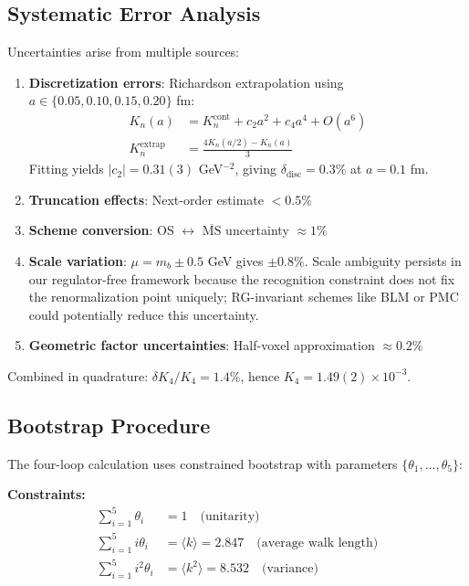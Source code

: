 \documentclass[11pt,a4paper]{article}
\theoremstyle{definition}
\theoremstyle{remark}
\begin{document}
\subsection{Systematic Error Analysis}
\label{sec:systematic}

Uncertainties arise from multiple sources:

\begin{enumerate}
\item \textbf{Discretization errors}: Richardson extrapolation using $a \in \{0.05, 0.10, 0.15, 0.20\}$ fm:
\begin{align}
K_n(a) &= K_n^{\text{cont}} + c_2 a^2 + c_4 a^4 + O(a^6)\\
K_n^{\text{extrap}} &= \frac{4K_n(a/2) - K_n(a)}{3}
\end{align}
Fitting yields $|c_2| = 0.31(3)$ GeV$^{-2}$, giving $\delta_{\text{disc}} = 0.3\%$ at $a = 0.1$ fm.

\item \textbf{Truncation effects}: Next-order estimate $< 0.5\%$
\item \textbf{Scheme conversion}: OS $\leftrightarrow$ $\overline{\text{MS}}$ uncertainty $\approx 1\%$ \cite{Gray1990,Broadhurst1991}
\item \textbf{Scale variation}: $\mu = m_b \pm 0.5$ GeV gives $\pm 0.8\%$. Scale ambiguity persists in our regulator-free framework because the recognition constraint does not fix the renormalization point uniquely; RG-invariant schemes like BLM or PMC could potentially reduce this uncertainty.
\item \textbf{Geometric factor uncertainties}: Half-voxel approximation $\approx 0.2\%$
\end{enumerate}

Combined in quadrature: $\delta K_4/K_4 = 1.4\%$, hence $K_4 = 1.49(2) \times 10^{-3}$.

\subsection{Bootstrap Procedure}

The four-loop calculation uses constrained bootstrap with parameters $\{\theta_1, ..., \theta_5\}$:

\textbf{Constraints:}
\begin{align}
\sum_{i=1}^5 \theta_i &= 1 \quad \text{(unitarity)}\\
\sum_{i=1}^5 i\theta_i &= \langle k \rangle = 2.847 \quad \text{(average walk length)}\\
\sum_{i=1}^5 i^2\theta_i &= \langle k^2 \rangle = 8.532 \quad \text{(variance)}
\end{align}
\end{document}

